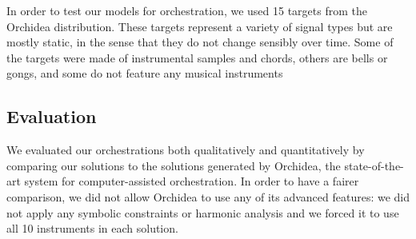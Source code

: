 \documentclass[runningheads,a4paper]{llncs}
\begin{document}
In order to test our models for orchestration, we used 15 targets from the Orchidea distribution. These targets represent a variety of signal types but are mostly static, in the sense that they do not change sensibly over time. Some of the targets were made of instrumental samples and chords, others are bells or gongs, and some do not feature any musical instruments

\begin{table}
	\centering    
    \caption{Quantitative comparison of orchestrations as ratios to Orchidea. Eqn. \ref{distance} was used to compute distances between orchestrations and targets. What is shown is the ratio between the distance calculated and Orchidea's distance for the same target. A value less than 1 means that the model performed worse (i.e. had a larger distance), and a value greater than 1 means the model performed better than Orchidea. The last column shows the ratio of the average distances for the model across all targets.}\label{orch_eval}
\end{table}

\subsection{Evaluation}

We evaluated our orchestrations both qualitatively and quantitatively by comparing our solutions to the solutions generated by Orchidea, the state-of-the-art system for computer-assisted orchestration. 
In order to have a fairer comparison, we did not allow Orchidea to use any of its advanced features: we did not apply any symbolic constraints or harmonic analysis and we forced it to use all 10 instruments in each solution.
\end{document}
